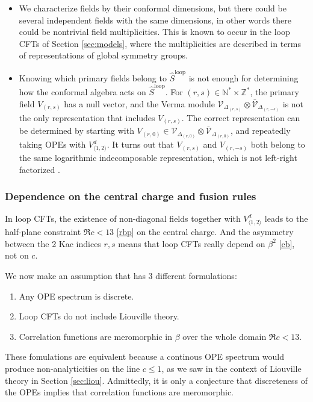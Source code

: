 \documentclass[12pt, a4paper]{article}
\theoremstyle{break}
\begin{document}
\begin{itemize}
 \item We characterize fields by their conformal dimensions, but there could be several independent fields with the same dimensions, in other words there could be nontrivial field multiplicities. This is known to occur in the loop CFTs of Section \ref{sec:models}, where the multiplicities are described in terms of representations of global symmetry groups.  
 \item Knowing which primary fields belong to $\widehat{S}^\text{loop}$ is not enough for determining how the conformal algebra acts on $\widehat{S}^\text{loop}$. For $(r,s)\in \mathbb{N}^*\times \mathbb{Z}^*$, the primary field $V_{(r,s)}$ has a null vector, and the Verma module $\mathcal{V}_{\Delta_{(r,s)}}\otimes\bar{\mathcal{V}}_{\Delta_{(r,-s)}}$ is not the only representation that includes $V_{(r,s)}$. The correct representation can be determined by starting with $V_{(r,0)}\in \mathcal{V}_{\Delta_{(r,0)}}\otimes\bar{\mathcal{V}}_{\Delta_{(r,0)}}$, and repeatedly taking OPEs with $V^d_{\langle 1,2\rangle}$. It turns out that $V_{(r,s)}$ and $V_{(r,-s)}$ both belong to the same logarithmic indecomposable representation, which is not left-right factorized  \cite{nr20}. 
\end{itemize}

\subsubsection{Dependence on the central charge and fusion rules}

In loop CFTs, the existence of non-diagonal fields together with $V^d_{\langle 1,2\rangle}$ leads to the half-plane constraint $\Re c<13$ \eqref{rbp} on the central charge. And the asymmetry between the 2 Kac indices $r,s$ means that loop CFTs really depend on $\beta^2$ \eqref{cb}, not on $c$. 

We now make an assumption that has 3 different formulations:
\begin{enumerate}
 \item Any OPE spectrum is discrete.
 \item Loop CFTs do not include Liouville theory. 
 \item Correlation functions are meromorphic in $\beta$ over the whole domain $\Re c<13$.
\end{enumerate}
These fomulations are equivalent because a continous OPE spectrum would produce non-analyticities on the line $c\leq 1$, as we saw in the context of Liouville theory in Section \ref{sec:liou}. Admittedly, it is only a conjecture that discreteness of the OPEs implies that correlation functions are meromorphic.
\end{document}
